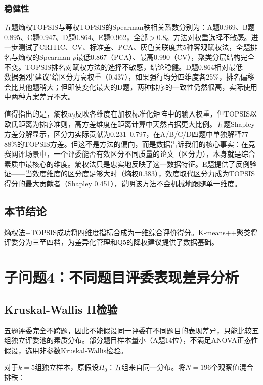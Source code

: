 \documentclass[UTF8,12pt]{ctexart}
\begin{document}
\subsubsection{稳健性}

五题熵权TOPSIS与等权TOPSIS的Spearman秩相关系数分别为：A题0.969、B题0.895、C题0.947、D题0.864、E题0.962，全部$>0.8$。方法对权重选择不敏感。进一步测试了CRITIC、CV、标准差、PCA、灰色关联度共5种客观赋权法，全题排名与熵权的Spearman $\rho$最低0.867（PCA）、最高0.990（CV），聚类分层结构完全不变。TOPSIS排名对赋权方法的选择不敏感，结论稳健。D题0.864相对最低——数据强烈"建议"给区分力高权重（0.437），如果强行均分四维度各25\%，排名偏移会比其他题稍大；但即使变化最大的D题，两种排序的一致性仍然很高，实际使用中两种方案差异不大。

值得指出的是，熵权$w_j$反映各维度在加权标准化矩阵中的输入权重，但TOPSIS以欧氏距离为排序准则，高方差维度在距离计算中天然占据更大比例。五题Shapley方差分解显示，区分力实际贡献为0.231--0.797，在A/B/C/D四题中单独解释77--88\%的TOPSIS方差。但这不是方法的偏向，而是数据告诉我们的核心事实：在竞赛网评场景中，一个评委能否有效区分不同质量的论文（区分力），本身就是综合素质中最核心的维度。熵权法只是忠实地反映了这一数据特征。E题提供了反例验证——当效度维度的区分度足够大时（熵权0.383），效度取代区分力成为TOPSIS得分的最大贡献者（Shapley 0.451），说明该方法不会机械地跟随单一维度。

\subsection{本节结论}

熵权法+TOPSIS成功将四维度指标合成为一维综合评价得分。K-means++聚类将评委分为三至四档，为差异化管理和Q5的降权建议提供了数据基础。

\section{子问题4：不同题目评委表现差异分析}

\subsection{Kruskal-Wallis H检验}

五题评委完全不跨题，因此不能假设同一评委在不同题目的表现差异，只能比较五组独立评委池的素质分布。部分题目样本量小（A题14位），不满足ANOVA正态性假设，选用非参数Kruskal-Wallis检验\cite{kruskal1952}。

对于$k=5$组独立样本，原假设$H_0$：五组来自同一分布。将$N=196$个观察值混合排秩：
\end{document}
